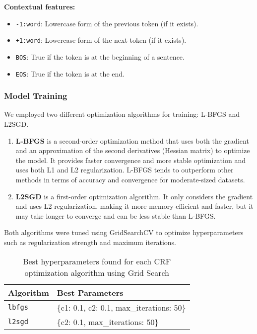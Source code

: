 \documentclass[9pt,a4paper,twoside]{tau-class/tau}
\begin{document}
    \textbf{Contextual features:}
    \begin{itemize}
        \item \texttt{-1:word}: Lowercase form of the previous token (if it exists).
        \item \texttt{+1:word}: Lowercase form of the next token (if it exists).
        \item \texttt{BOS}: True if the token is at the beginning of a sentence.
        \item \texttt{EOS}: True if the token is at the end.
    \end{itemize}


        \subsubsection{Model Training}
            We employed two different optimization algorithms for training: L-BFGS and L2SGD.
            \begin{enumerate}
                \item \textbf{L-BFGS} is a second-order optimization method that uses both the gradient and an approximation of the second derivatives (Hessian matrix) to optimize the model. It provides faster convergence and more stable optimization and uses both L1 and L2 regularization. L-BFGS tends to outperform other methods in terms of accuracy and convergence for moderate-sized datasets.
                
                \item \textbf{L2SGD} is a first-order optimization algorithm. It only considers the gradient and uses L2 regularization, making it more memory-efficient and faster, but it may take longer to converge and can be less stable than L-BFGS.
            \end{enumerate}

        Both algorithms were tuned using GridSearchCV to optimize hyperparameters such as regularization strength and maximum iterations. 
        \begin{table}[h]
        \centering
        \begin{tabular}{|l|l|}
        \hline
        \textbf{Algorithm} & \textbf{Best Parameters} \\
        \hline
        \texttt{lbfgs} & \{c1: 0.1, c2: 0.1, max\_iterations: 50\} \\
        \texttt{l2sgd} & \{c2: 0.1, max\_iterations: 50\} \\
        \hline
        \end{tabular}
        \caption{Best hyperparameters found for each CRF optimization algorithm using Grid Search}
        \end{table}
\end{document}
